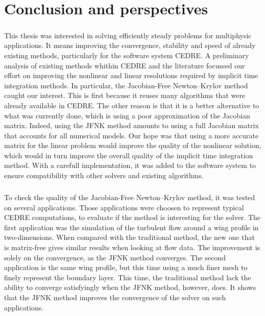 \chapter*{Conclusion and perspectives}

  \paragraph{}
  This thesis was interested in solving efficiently steady problems for multiphysic applications.
  It means improving the convergence, stability and speed of already existing methods, particularly for the software system CEDRE.
  A preliminary analysis of existing methods whithin CEDRE and the literature focussed our effort on improving the nonlinear and linear resolutions required by implicit time integration methods.
  In particular, the Jacobian-Free Newton--Krylov method caught our interest.
  This is first because it reuses many algorithms that were already available in CEDRE.
  The other reason is that it is a better alternative to what was currently done, which is using a poor approximation of the Jacobian matrix.
  Indeed, using the JFNK method amounts to using a full Jacobian matrix that accounts for all numerical models.
  Our hope was that using a more accurate matrix for the linear problem would improve the quality of the nonlinear solution, which would in turn improve the overall quality of the implicit time integration method.
  With a carefull implementation, it was added to the software system to ensure compatibility with other solvers and existing algorithms.

  \paragraph{}
  To check the quality of the Jacobian-Free Newton--Krylov method, it was tested on several applications.
  Those applications were choosen to represent typical CEDRE computations, to evaluate if the method is interesting for the solver.
  The first application was the simulation of the turbulent flow around a wing profile in two-dimensions.
  When compared with the traditional method, the new one that is matrix-free gives similar results when looking at flow data.
  The improvement is solely on the convergence, as the JFNK method converges.
  The second application is the same wing profile, but this time using a much finer mesh to finely represent the boundary layer.
  This time, the traditional method lack the ability to converge satisfyingly when the JFNK method, however, does.
  It shows that the JFNK method improves the convergence of the solver on such applications.

